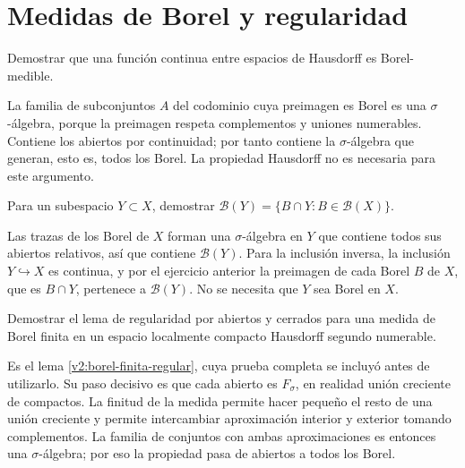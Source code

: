 \chapter{Medidas de Borel y regularidad}

\begin{ejercicio}\label{ej:v2-l31-1}
Demostrar que una función continua entre espacios de Hausdorff es Borel-medible.
\end{ejercicio}
\begin{solucion}
La familia de subconjuntos $A$ del codominio cuya preimagen es Borel es una $\sigma$-álgebra, porque la preimagen respeta complementos y uniones numerables. Contiene los abiertos por continuidad; por tanto contiene la $\sigma$-álgebra que generan, esto es, todos los Borel. La propiedad Hausdorff no es necesaria para este argumento.
\end{solucion}

\begin{ejercicio}\label{ej:v2-l31-2}
Para un subespacio $Y\subset X$, demostrar $\mathcal B(Y)=\{B\cap Y:B\in\mathcal B(X)\}$.
\end{ejercicio}
\begin{solucion}
Las trazas de los Borel de $X$ forman una $\sigma$-álgebra en $Y$ que contiene todos sus abiertos relativos, así que contiene $\mathcal B(Y)$. Para la inclusión inversa, la inclusión $Y\hookrightarrow X$ es continua, y por el ejercicio anterior la preimagen de cada Borel $B$ de $X$, que es $B\cap Y$, pertenece a $\mathcal B(Y)$. No se necesita que $Y$ sea Borel en $X$.
\end{solucion}

\begin{ejercicio}\label{ej:v2-l31-3}
Demostrar el lema de regularidad por abiertos y cerrados para una medida de Borel finita en un espacio localmente compacto Hausdorff segundo numerable.
\end{ejercicio}
\begin{solucion}
Es el lema \ref{v2:borel-finita-regular}, cuya prueba completa se incluyó antes de utilizarlo. Su paso decisivo es que cada abierto es $F_\sigma$, en realidad unión creciente de compactos. La finitud de la medida permite hacer pequeño el resto de una unión creciente y permite intercambiar aproximación interior y exterior tomando complementos. La familia de conjuntos con ambas aproximaciones es entonces una $\sigma$-álgebra; por eso la propiedad pasa de abiertos a todos los Borel.
\end{solucion}

